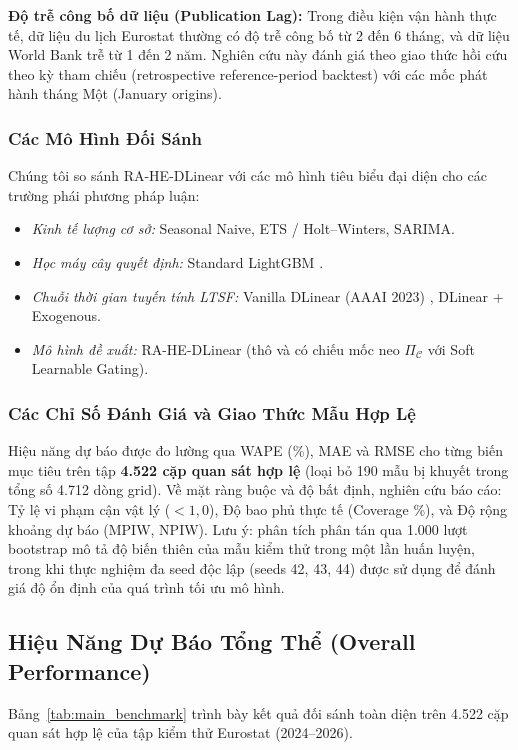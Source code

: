 \documentclass[10pt,journal,compsoc]{IEEEtran}
\begin{document}
\noindent \textbf{Độ trễ công bố dữ liệu (Publication Lag):} Trong điều kiện vận hành thực tế, dữ liệu du lịch Eurostat thường có độ trễ công bố từ 2 đến 6 tháng, và dữ liệu World Bank trễ từ 1 đến 2 năm. Nghiên cứu này đánh giá theo giao thức hồi cứu theo kỳ tham chiếu (retrospective reference-period backtest) với các mốc phát hành tháng Một (January origins).

\subsubsection{Các Mô Hình Đối Sánh}
Chúng tôi so sánh RA-HE-DLinear với các mô hình tiêu biểu đại diện cho các trường phái phương pháp luận:
\begin{itemize}
    \item \textit{Kinh tế lượng cơ sở:} Seasonal Naive, ETS / Holt--Winters, SARIMA.
    \item \textit{Học máy cây quyết định:} Standard LightGBM \cite{ke2017lightgbm}.
    \item \textit{Chuỗi thời gian tuyến tính LTSF:} Vanilla DLinear (AAAI 2023) \cite{zeng2023dlinear}, DLinear + Exogenous.
    \item \textit{Mô hình đề xuất:} RA-HE-DLinear (thô và có chiếu mốc neo $\Pi_{\mathcal{C}}$ với Soft Learnable Gating).
\end{itemize}

\subsubsection{Các Chỉ Số Đánh Giá và Giao Thức Mẫu Hợp Lệ}
Hiệu năng dự báo được đo lường qua WAPE (\%), MAE và RMSE cho từng biến mục tiêu trên tập \textbf{4.522 cặp quan sát hợp lệ} (loại bỏ 190 mẫu bị khuyết trong tổng số 4.712 dòng grid). Về mặt ràng buộc và độ bất định, nghiên cứu báo cáo: Tỷ lệ vi phạm cận vật lý ($<1,0$), Độ bao phủ thực tế (Coverage \%), và Độ rộng khoảng dự báo (MPIW, NPIW). Lưu ý: phân tích phân tán qua 1.000 lượt bootstrap mô tả độ biến thiên của mẫu kiểm thử trong một lần huấn luyện, trong khi thực nghiệm đa seed độc lập (seeds 42, 43, 44) được sử dụng để đánh giá độ ổn định của quá trình tối ưu mô hình.

\subsection{Hiệu Năng Dự Báo Tổng Thể (Overall Performance)}
Bảng~\ref{tab:main_benchmark} trình bày kết quả đối sánh toàn diện trên 4.522 cặp quan sát hợp lệ của tập kiểm thử Eurostat (2024--2026).
\end{document}
